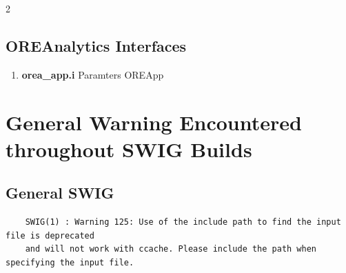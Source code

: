 \documentclass[10pt]{article}
\begin{document}
\begin{multicols}{2}
\begin{enumerate}
    \end{enumerate}
\end{multicols}

\pagebreak

\subsection*{OREAnalytics Interfaces}

    \begin{enumerate}
            \item \textbf{orea\_app.i}
                \subitem Paramters
                \subitem OREApp
    \end{enumerate}


\pagebreak
\section*{General Warning Encountered throughout SWIG Builds}
\subsection{General SWIG}
\begin{verbatim}
    SWIG(1) : Warning 125: Use of the include path to find the input file is deprecated
    and will not work with ccache. Please include the path when specifying the input file.
\end{verbatim}
\end{document}
